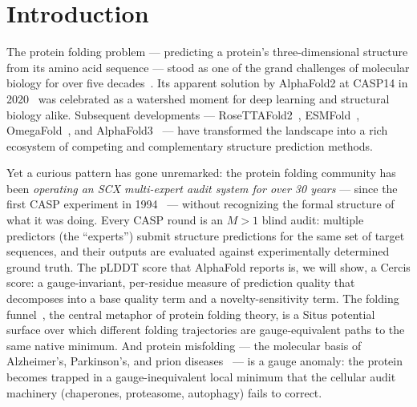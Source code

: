 \documentclass[12pt,a4paper]{article}
\theoremstyle{remark}
\newcommand{\Yajie}{\textsf{Yajie}}
\newcommand{\pLDDT}{\textsf{pLDDT}}
\begin{document}
\begin{abstract}
We close with the \Yajie{} Consensus Protocol for structure prediction, a concrete algorithm that integrates \pLDDT-based Cercis scoring, multi-predictor consensus, and experimental validation into a unified audit framework.
All theoretical claims are accompanied by a numerical verification suite (\texttt{verify\_protein\_folding.py}) demonstrating the gauge invariance of folding scores, the Cercis character of \pLDDT, and the detectability of misfolding gauge anomalies.
\end{abstract}

\tableofcontents
\newpage

\section{Introduction}
\label{sec:intro}

The protein folding problem — predicting a protein's three-dimensional structure from its amino acid sequence — stood as one of the grand challenges of molecular biology for over five decades~\cite{anfinsen1973principles, dill2008protein}.
Its apparent solution by AlphaFold2 at CASP14 in 2020~\cite{jumper2021highly} was celebrated as a watershed moment for deep learning and structural biology alike.
Subsequent developments — RoseTTAFold2~\cite{baek2021accurate}, ESMFold~\cite{lin2023evolutionary}, OmegaFold~\cite{wu2022high}, and AlphaFold3~\cite{abramson2024accurate} — have transformed the landscape into a rich ecosystem of competing and complementary structure prediction methods.

Yet a curious pattern has gone unremarked: the protein folding community has been \emph{operating an SCX multi-expert audit system for over 30 years} — since the first CASP experiment in 1994~\cite{moult1995large} — without recognizing the formal structure of what it was doing.
Every CASP round is an $M > 1$ blind audit: multiple predictors (the ``experts'') submit structure predictions for the same set of target sequences, and their outputs are evaluated against experimentally determined ground truth.
The pLDDT score that AlphaFold reports is, we will show, a Cercis score: a gauge-invariant, per-residue measure of prediction quality that decomposes into a base quality term and a novelty-sensitivity term.
The folding funnel~\cite{bryngelson1995funnels}, the central metaphor of protein folding theory, is a Situs potential surface over which different folding trajectories are gauge-equivalent paths to the same native minimum.
And protein misfolding — the molecular basis of Alzheimer's, Parkinson's, and prion diseases~\cite{chiti2017protein} — is a gauge anomaly: the protein becomes trapped in a gauge-inequivalent local minimum that the cellular audit machinery (chaperones, proteasome, autophagy) fails to correct.
\end{document}

